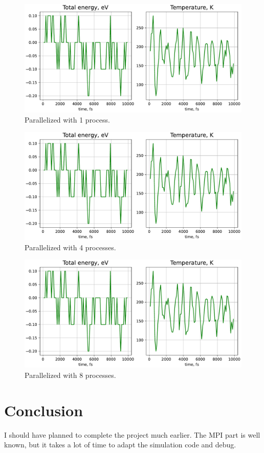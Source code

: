 \documentclass[12pt,a4paper]{article}
\begin{document}
\begin{figure}[h!]
	\centering
	\includegraphics[width=.9\linewidth]{img/milestone08-1proc.pdf}
	\caption{Parallelized with 1 process.}
	\label{fig:parallel-1}
\end{figure}

\begin{figure}[h!]
	\centering
	\includegraphics[width=.9\linewidth]{img/milestone08-4proc.pdf}
	\caption{Parallelized with 4 processes.}
	\label{fig:parallel-2}
\end{figure}

\begin{figure}[h!]
	\centering
	\includegraphics[width=.9\linewidth]{img/milestone08-8proc.pdf}
	\caption{Parallelized with 8 processes.}
	\label{fig:parallel-3}
\end{figure}

\clearpage %

\section{Conclusion}
\label{conclusion}

I should have planned to complete the project much earlier. The MPI part is well known, but it takes a lot of time to adapt the simulation code and debug.

\newpage
{\small
	
	
}
\end{document}
